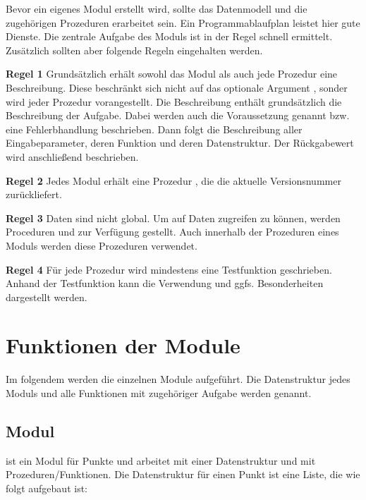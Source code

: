 Bevor ein eigenes Modul erstellt wird, sollte das Datenmodell und die zugehörigen Prozeduren erarbeitet sein. Ein Programmablaufplan leistet hier gute Dienste. Die zentrale Aufgabe des Moduls ist in der Regel schnell ermittelt. Zusätzlich sollten aber folgende Regeln eingehalten werden.

\bigskip

\textbf{Regel 1} Grundsätzlich erhält sowohl das Modul als auch jede Prozedur eine Beschreibung. Diese beschränkt sich nicht auf das optionale Argument , sonder wird jeder Prozedur vorangestellt. Die Beschreibung enthält grundsätzlich die Beschreibung der Aufgabe. Dabei werden auch die Voraussetzung genannt bzw. eine Fehlerbhandlung beschrieben. Dann folgt die Beschreibung aller Eingabeparameter, deren Funktion und deren Datenstruktur. Der Rückgabewert wird anschließend beschrieben.

\bigskip

\textbf{Regel 2} Jedes Modul erhält eine Prozedur , die die aktuelle Versionsnummer zurückliefert.


\bigskip

\textbf{Regel 3} Daten sind nicht global. Um auf Daten zugreifen zu können, werden Proceduren  und  zur Verfügung gestellt. Auch innerhalb der Prozeduren eines Moduls werden diese Prozeduren verwendet.

\bigskip

\textbf{Regel 4} Für jede Prozedur wird mindestens eine Testfunktion geschrieben. Anhand der Testfunktion kann die Verwendung und ggfs. Besonderheiten dargestellt werden.

\section{Funktionen der Module}

Im folgendem werden die einzelnen Module aufgeführt. Die Datenstruktur jedes Moduls und alle Funktionen mit zugehöriger Aufgabe werden genannt.

\subsection{Modul }

 ist ein Modul für Punkte und arbeitet mit einer Datenstruktur und mit Prozeduren/Funktionen. Die Datenstruktur  für einen Punkt ist eine Liste, die wie folgt aufgebaut ist:

